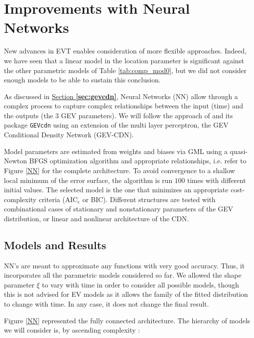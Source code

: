 \section{Improvements with Neural Networks}\label{sec:nnxp}


New advances in EVT enables consideration of more flexible approaches. Indeed, we have seen that a linear model in the location parameter is significant against the other parametric models of Table \ref{tab:comp_mod0}, but we did not consider enough models to be able to sustain this conclusion.

As discussed in \hyperref[sec:gevcdn]{Section\textbf{ \ref{sec:gevcdn}}}, Neural Networks (NN) allow through a complex process to capture complex relationships between the input (time) and the outputs (the 3 GEV parameters). We will follow the approach of \citet{cannon_flexible_2010} and its package \texttt{GEVcdn} using an extension of the multi layer perceptron, the GEV Conditional Density Network (GEV-CDN).

Model parameters are estimated from weights and biases via GML using a quasi-Newton BFGS optimization algorithm and appropriate relationships, i.e. refer to Figure \ref{NN} for the complete architecture. 
To avoid convergence to a shallow local minimum of the error surface, the algorithm is run $100$ times with different initial values.
The selected model is the one that minimizes an appropriate cost-complexity criteria ($\text{AIC}_{\text{c}}$ or BIC). Different structures are tested with combinational cases of stationary and nonstationary parameters of the GEV distribution, or linear and nonlinear architecture of the CDN. 


\subsection{Models and Results}


NN's are meant to approximate any functions with very good accuracy. Thus, it incorporates all the parametric models considered so far. We allowed the shape parameter $\xi$ to vary with time in order to consider all possible models, though this is not advised for EV models as it allows the family of the fitted distribution to change with time. In any case, it does not change the final result. 

Figure \ref{NN} represented the fully connected architecture. The hierarchy of models we will consider is, by ascending complexity :

